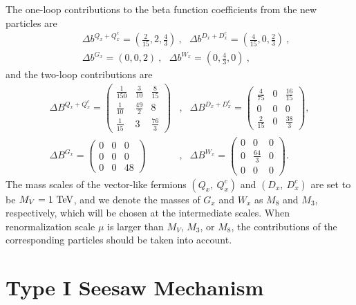 \documentclass[aps,prd,preprint,superscriptaddress,showpacs,ctexart]{revtex4-1}
\begin{document}
The one-loop contributions to the beta function coefficients from
the new particles are ~\cite{GCU,Barger:2007qb}
\begin{eqnarray*}
 &  & \Delta b^{Q_{x}+Q_{x}^{c}}=\left(\frac{2}{15},2,\frac{4}{3}\right)~,~~~\Delta b^{D_{x}+D_{x}^{c}}=\left(\frac{4}{15},0,\frac{2}{3}\right)~,~\\
 &  & \Delta b^{G_{x}}=(0,0,2)~,~~~\Delta b^{W_{x}}=\left(0,\frac{4}{3},0\right)~,~
\end{eqnarray*}
and the two-loop contributions are
\begin{eqnarray}
\Delta B^{Q_{x}+Q_{x}^{c}}=\left(\begin{array}{ccc}
\frac{1}{150} & \frac{3}{10} & \frac{8}{15}\\
\frac{1}{10} & \frac{49}{2} & 8\\
\frac{1}{15} & 3 & \frac{76}{3}
\end{array}\right) & , & \Delta B^{D_{x}+D_{x}^{c}}=\left(\begin{array}{ccc}
\frac{4}{75} & 0 & \frac{16}{15}\\
0 & 0 & 0\\
\frac{2}{15} & 0 & \frac{38}{3}
\end{array}\right),\label{2a}\\
\Delta B^{G_{x}}=\left(\begin{array}{ccc}
0 & 0 & 0\\
0 & 0 & 0\\
0 & 0 & 48
\end{array}\right) & , & \Delta B^{W_{x}}=\left(\begin{array}{ccc}
0 & 0 & 0\\
0 & \frac{64}{3} & 0\\
0 & 0 & 0
\end{array}\right).
\end{eqnarray}
The mass scales of the vector-like fermions $(Q_{x},~Q_{x}^{c})$
and $(D_{x},~D_{x}^{c})$ are set to be $M_{V}=1~{\rm TeV}$, and
we denote the masses of $G_{x}$ and $W_{x}$ as $M_{8}$ and $M_{3}$,
respectively, which will be chosen at the intermediate scales. When
renormalization scale $\mu$ is larger than $M_{V}$, $M_{3}$, or
$M_{8}$, the contributions of the corresponding particles should
be taken into account.

\section{Type I Seesaw Mechanism}
\end{document}
